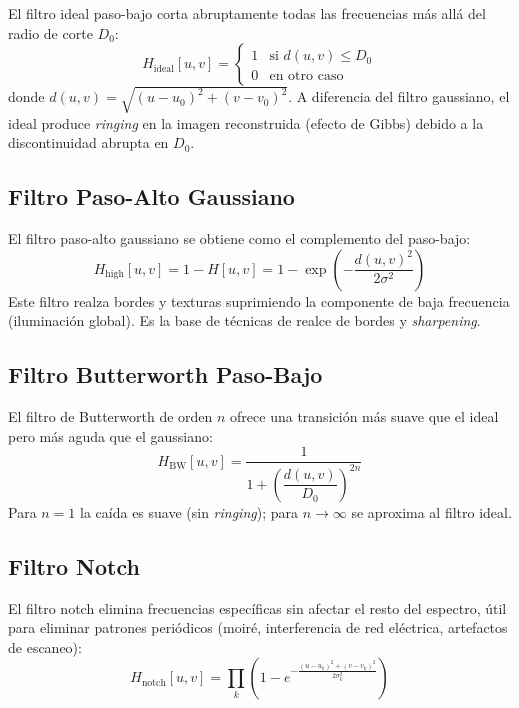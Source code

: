 \documentclass[conference]{IEEEtran}
\begin{document}
El filtro ideal paso-bajo corta abruptamente todas las frecuencias más
allá del radio de corte $D_0$:
\begin{equation}
  H_{\text{ideal}}[u,v] =
  \begin{cases}
    1 & \text{si } d(u,v) \le D_0 \\
    0 & \text{en otro caso}
  \end{cases}
  \label{eq:filtro_ideal}
\end{equation}
donde $d(u,v)=\sqrt{(u-u_0)^2+(v-v_0)^2}$.
A diferencia del filtro gaussiano, el ideal produce \textit{ringing} en
la imagen reconstruida (efecto de Gibbs) debido a la discontinuidad abrupta
en $D_0$.

\subsection{Filtro Paso-Alto Gaussiano}

El filtro paso-alto gaussiano se obtiene como el complemento del paso-bajo:
\begin{equation}
  H_{\text{high}}[u,v] = 1 - H[u,v]
  = 1 - \exp\!\left(-\frac{d(u,v)^2}{2\sigma^2}\right)
  \label{eq:filtro_paso_alto}
\end{equation}
Este filtro realza bordes y texturas suprimiendo la componente de baja
frecuencia (iluminación global). Es la base de técnicas de realce de bordes
y \textit{sharpening}.

\subsection{Filtro Butterworth Paso-Bajo}

El filtro de Butterworth de orden $n$ ofrece una transición más suave que
el ideal pero más aguda que el gaussiano:
\begin{equation}
  H_{\text{BW}}[u,v] = \frac{1}{1+\left(\dfrac{d(u,v)}{D_0}\right)^{2n}}
  \label{eq:filtro_butterworth}
\end{equation}
Para $n=1$ la caída es suave (sin \textit{ringing}); para $n\to\infty$
se aproxima al filtro ideal.

\subsection{Filtro Notch}

El filtro notch elimina frecuencias específicas sin afectar el resto del
espectro, útil para eliminar patrones periódicos (moiré, interferencia de
red eléctrica, artefactos de escaneo):
\begin{equation}
  H_{\text{notch}}[u,v] = \prod_{k}\left(1 -
    e^{-\frac{(u-u_k)^2+(v-v_k)^2}{2\sigma_k^2}}\right)
  \label{eq:filtro_notch}
\end{equation}
\end{document}
